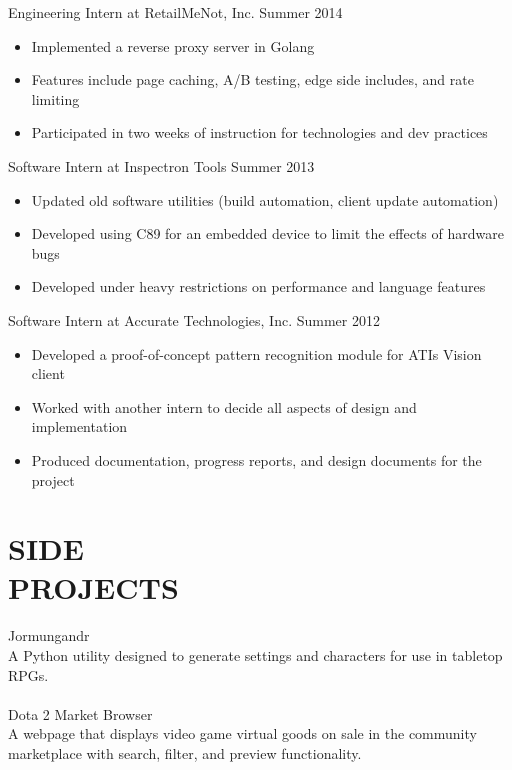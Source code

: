 \documentclass[line,margin]{res}
\begin{document}
\begin{resume}
                {\sc Engineering Intern at RetailMeNot, Inc.} \hfill Summer 2014
                 \begin{itemize}  \itemsep -2pt %
                 \item Implemented a reverse proxy server in Golang
                 \item Features include page caching, A/B testing, edge side includes, and rate limiting
                 \item Participated in two weeks of instruction for technologies and dev practices
                 \end{itemize}

                {\sc Software Intern at Inspectron Tools} \hfill Summer 2013
                 \begin{itemize}  \itemsep -2pt %
                 \item Updated old software utilities (build automation, client update automation)
                 \item Developed using C89 for an embedded device to limit the effects of hardware bugs
                 \item Developed under heavy restrictions on performance and language features
                 \end{itemize}
 
                {\sc Software Intern at Accurate Technologies, Inc.} \hfill            Summer 2012
                 \begin{itemize}  \itemsep -2pt %
                 \item Developed a proof-of-concept pattern recognition module for ATI\textquotesingle s Vision client
                 \item Worked with another intern to decide all aspects of design and implementation
                 \item Produced documentation, progress reports, and design documents for the project
                 \end{itemize} 

\section{\textcolor{HeaderColor}{SIDE \\ PROJECTS}}
	{\sc Jormungandr} \\
	A Python utility designed to generate settings and characters for use in tabletop RPGs.\\
\\
	{\sc Dota 2 Market Browser} \\
	A webpage that displays video game virtual goods on sale in the community marketplace with search, filter, and preview functionality.\\
	


\end{resume}
\end{document}
